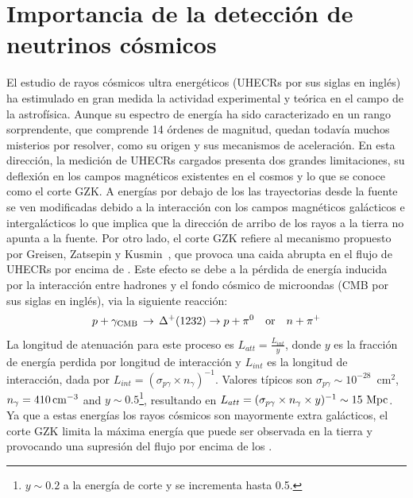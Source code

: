 \section{Importancia de la detecci\'on de neutrinos c\'osmicos}
%
%
%
%
El estudio de rayos c\'osmicos ultra energ\'eticos (UHECRs por sus siglas en ingl\'es) ha estimulado en gran medida la actividad experimental y te\'orica en el campo de la astrof\'isica.
Aunque su espectro de energ\'ia ha sido caracterizado en un rango sorprendente, que comprende 14 \'ordenes de magnitud, quedan todav\'ia muchos misterios por resolver, como su origen y sus mecanismos de aceleraci\'on.
En esta direcci\'on, la medici\'on de UHECRs cargados presenta dos grandes limitaciones, su deflexi\'on en los campos magn\'eticos existentes en el cosmos y lo que se conoce como el corte GZK.
A energ\'ias por debajo de los  las trayectorias desde la fuente se ven modificadas debido a la interacci\'on con los campos magn\'eticos gal\'acticos e intergal\'acticos lo que implica que la direcci\'on de arribo de los rayos a la tierra no apunta a la fuente.
Por otro lado, el corte GZK refiere al mecanismo propuesto por Greisen, Zatsepin y Kusmin~\cite{cite:Greisen,cite:Zatsepin}, que provoca una caida abrupta en el flujo de UHECRs por encima de .
Este efecto se debe a la p\'erdida de energ\'ia inducida por la interacci\'on entre hadrones y el fondo c\'osmico de microondas (CMB por sus siglas en ingl\'es), via la siguiente reacci\'on:
%
\begin{equation}
p + \gamma_{\rm CMB}\, \rightarrow\, \Delta^{+}(1232)  \rightarrow p +\pi^{0}\quad {\rm or}\quad n +\pi^{+}
\end{equation}
%
La longitud de atenuaci\'on para este proceso es $L_{att}=\frac{L_{int}}{y}$, donde $y$ es la fracci\'on de energ\'ia perdida por longitud de interacci\'on y $L_{int}$ es la longitud de interacci\'on, dada por $L_{int}=(\sigma_{p\gamma}\times n_{\gamma})^{-1}$.
Valores t\'ipicos son $\sigma_{p\gamma}\sim 10^{-28}$~cm$^{2}$, $ n_{\gamma}=410\,{\rm cm}^{-3}$ and $y\sim0.5$\footnote{$y\sim0.2$ a la energ\'ia de corte y se incrementa hasta 0.5.}, resultando en 
$L_{att}=(\sigma_{p\gamma}\times n_{\gamma}\times y)^{-1}\sim 15\mbox{ }{\rm Mpc}$. 
Ya que a estas energ\'ias los rayos c\'osmicos son mayormente extra gal\'acticos, el corte GZK limita la m\'axima energ\'ia que puede ser observada en la tierra y provocando una supresi\'on del flujo por encima de los .

